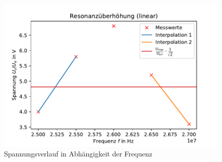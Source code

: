 \documentclass[
  bibliography=totoc,     %
  captions=tableheading,  %
  titlepage=firstiscover, %
]{scrartcl}
\begin{document}
    \begin{figure}
      \centering
      \includegraphics{resonanzuberhohung.pdf}
      \caption{Spannungsverlauf in Abhängigkeit der Frequenz}
      \label{fig:resonanzzoom}
    \end{figure}
\end{document}
